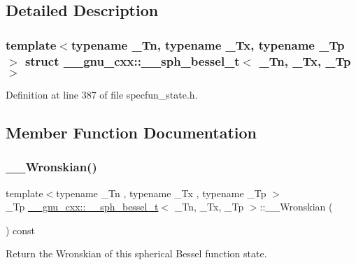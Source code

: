 \subsection{Detailed Description}
\subsubsection*{template$<$typename \+\_\+\+Tn, typename \+\_\+\+Tx, typename \+\_\+\+Tp$>$\newline
struct \+\_\+\+\_\+gnu\+\_\+cxx\+::\+\_\+\+\_\+sph\+\_\+bessel\+\_\+t$<$ \+\_\+\+Tn, \+\_\+\+Tx, \+\_\+\+Tp $>$}



Definition at line 387 of file specfun\+\_\+state.\+h.



\subsection{Member Function Documentation}
\mbox{\label{struct____gnu__cxx_1_1____sph__bessel__t_aefdc67ff4bd4b74bf6337c2a5724849b}} 
\subsubsection{\texorpdfstring{\+\_\+\+\_\+\+Wronskian()}{\_\_Wronskian()}}
{\footnotesize\ttfamily template$<$typename \+\_\+\+Tn , typename \+\_\+\+Tx , typename \+\_\+\+Tp $>$ \\
\+\_\+\+Tp \hyperlink{struct____gnu__cxx_1_1____sph__bessel__t}{\+\_\+\+\_\+gnu\+\_\+cxx\+::\+\_\+\+\_\+sph\+\_\+bessel\+\_\+t}$<$ \+\_\+\+Tn, \+\_\+\+Tx, \+\_\+\+Tp $>$\+::\+\_\+\+\_\+\+Wronskian (\begin{DoxyParamCaption}{ }\end{DoxyParamCaption}) const\hspace{0.3cm}{\ttfamily [inline]}}



Return the Wronskian of this spherical Bessel function state. 



